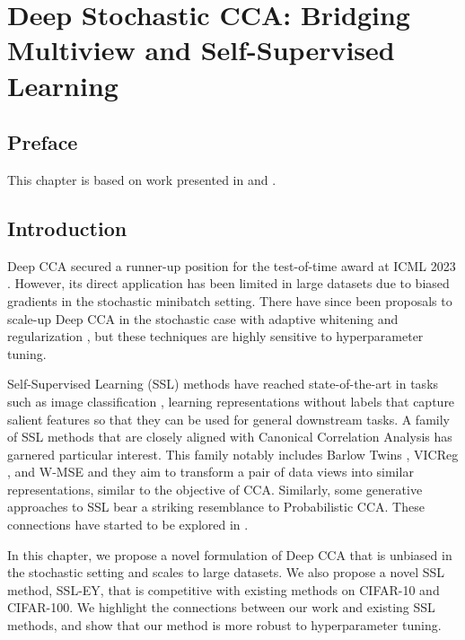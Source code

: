 \graphicspath{{chapters/deep_learning/}}

\chapter{Deep Stochastic CCA: Bridging Multiview and Self-Supervised Learning}\label{ch:deep_learning}
\minitoc
\section*{Preface}

This chapter is based on work presented in \citet{chapman2023cca} and \citet{chapman2023efficient}.

\section{Introduction}

Deep CCA \citep{andrew2013deep} secured a runner-up position for the test-of-time award at ICML 2023 \citep{ICML2023TOT}.
However, its direct application has been limited in large datasets due to biased gradients in the stochastic minibatch setting.
There have since been proposals to scale-up Deep CCA in the stochastic case with adaptive whitening \citep{wang2015stochastic} and regularization \citep{chang2018scalable}, but these techniques are highly sensitive to hyperparameter tuning.

Self-Supervised Learning (SSL) methods have reached state-of-the-art in tasks such as image classification \citep{balestriero2023cookbook}, learning representations without labels that capture salient features so that they can be used for general downstream tasks.
A family of SSL methods that are closely aligned with Canonical Correlation Analysis has garnered particular interest.
This family notably includes Barlow Twins \citep{zbontar2021barlow}, VICReg \citep{bardes2021vicreg}, and W-MSE \citep{ermolov2021whitening} and they aim to transform a pair of data views into similar representations, similar to the objective of CCA. Similarly, some generative approaches to SSL\citep{sansone2022gedi} bear a striking resemblance to Probabilistic CCA\citep{bach2005probabilistic}.
These connections have started to be explored in \citet{balestriero2022contrastive}.

In this chapter, we propose a novel formulation of Deep CCA that is unbiased in the stochastic setting and scales to large datasets.
We also propose a novel SSL method, SSL-EY, that is competitive with existing methods on CIFAR-10 and CIFAR-100.
We highlight the connections between our work and existing SSL methods, and show that our method is more robust to hyperparameter tuning.

